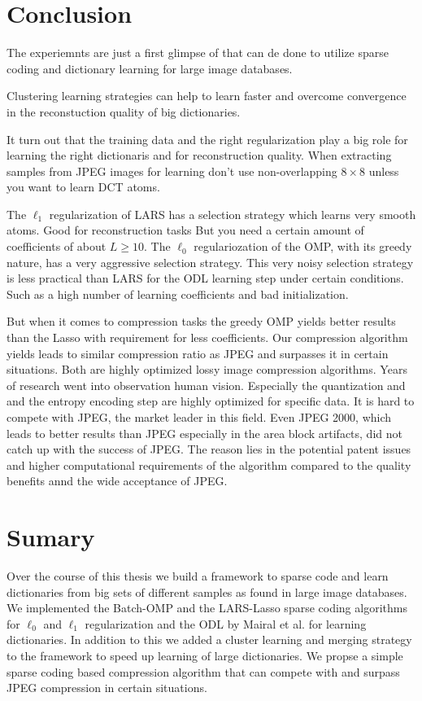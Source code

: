 \section{Conclusion}
The experiemnts are just a first glimpse of that can de done to utilize sparse
coding and dictionary learning for large image databases.

Clustering learning strategies can help to learn faster and overcome
convergence in the reconstuction quality of big dictionaries.


It turn out that the training data and the right 
regularization play a big role for learning the right dictionaris and
for reconstruction quality. When extracting samples from JPEG images for
learning don't use non-overlapping $8 \times 8$ unless you want to learn DCT
atoms. 

The $\ell_1$ regularization of LARS has a selection strategy
which learns very smooth atoms. Good for reconstruction tasks 
But you need a certain amount of coefficients of about $L \ge 10$.
The $\ell_0$ regulariozation of the OMP, with its greedy nature, has a very
aggressive selection strategy. 
This very noisy selection strategy is less practical
than LARS for the ODL learning step under certain conditions. Such as a high
number of learning coefficients and bad initialization.

But when it comes to compression tasks the greedy OMP yields better results
than the Lasso with requirement for less coefficients. 
Our compression algorithm yields leads to similar compression ratio as JPEG
and surpasses it in certain situations. Both are highly optimized lossy image
compression algorithms.  Years of research went into observation human vision. 
Especially the quantization and and the entropy encoding step are highly
optimized for specific data. It is hard to compete with JPEG, the market leader
in this field.  Even JPEG 2000, which leads to better results than JPEG
especially in the area block artifacts, did not catch up with the success of
JPEG.  The reason lies in the potential patent issues and higher computational
requirements of the algorithm compared to the quality benefits annd the wide
acceptance of JPEG.



\section{Sumary}
Over the course of this thesis we build a framework to sparse code and learn
dictionaries from big sets of different samples as found in large image
databases. We implemented the Batch-OMP and the LARS-Lasso sparse coding
algorithms for $\ell_0$ and $\ell_1$ regularization and the ODL by Mairal et
al. for learning dictionaries. 
In addition to this we added a cluster learning and merging strategy to the
framework to speed up learning of large dictionaries.
We propse a simple sparse coding based compression algorithm that can compete
with and surpass JPEG compression in certain situations.


